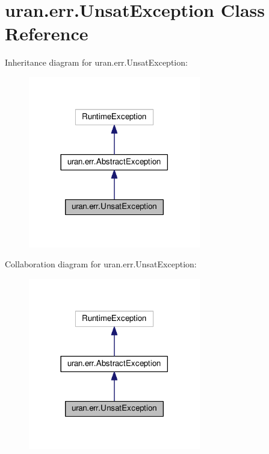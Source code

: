\hypertarget{classuran_1_1err_1_1_unsat_exception}{}\section{uran.\+err.\+Unsat\+Exception Class Reference}
\label{classuran_1_1err_1_1_unsat_exception}


Inheritance diagram for uran.\+err.\+Unsat\+Exception\+:
\nopagebreak
\begin{figure}[H]
\begin{center}
\leavevmode
\includegraphics[width=213pt]{classuran_1_1err_1_1_unsat_exception__inherit__graph}
\end{center}
\end{figure}


Collaboration diagram for uran.\+err.\+Unsat\+Exception\+:
\nopagebreak
\begin{figure}[H]
\begin{center}
\leavevmode
\includegraphics[width=213pt]{classuran_1_1err_1_1_unsat_exception__coll__graph}
\end{center}
\end{figure}
